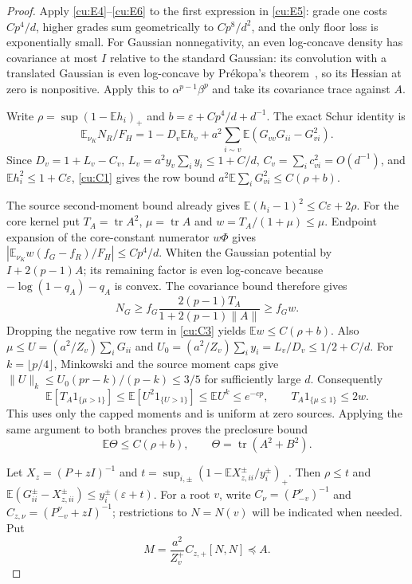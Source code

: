 \documentclass[10pt]{article}
\numberwithin{equation}{section}
\newcommand{\1}{\mathbf1}
\begin{document}
\begin{proof}
Apply \eqref{cu:E4}--\eqref{cu:E6} to the first expression in
\eqref{cu:E5}: grade one costs $Cp^4/d$, higher grades sum geometrically
to $Cp^8/d^2$, and the only floor loss is exponentially small.
For Gaussian nonnegativity, an even log-concave density has covariance
at most $I$ relative to the standard Gaussian: its convolution with
a translated Gaussian is even log-concave by Pr\'ekopa's theorem~\cite{Prekopa},
so its Hessian at zero is nonpositive. Apply this to
$\alpha^{p-1}\beta^p$ and take its covariance trace against $A$.

Write $\rho=\sup(1-\mathbb Eh_i)_+$ and
$b=\varepsilon+Cp^4/d+d^{-1}$. The exact Schur identity is
\[
 \mathbb E_{\nu_K}N_R/F_H
 =1-D_v\mathbb Eh_v
   +a^2\sum_{i\sim v}\mathbb E(G_{vv}G_{ii}-G_{vi}^2).
 \tag{C3}\label{cu:C3}
\]
Since $D_v=1+L_v-C_v$, $L_v=a^2y_v\sum_i y_i\le1+C/d$,
$C_v=\sum_i c_{vi}^2=O(d^{-1})$, and $\mathbb Eh_i^2\le1+C\varepsilon$,
\eqref{cu:C1} gives the row bound
$a^2\mathbb E\sum_iG_{vi}^2\le C(\rho+b)$.

The source second-moment bound already gives
$\mathbb E(h_i-1)^2\le C\varepsilon+2\rho$.
For the core kernel put $T_A=\operatorname{tr}A^2$,
$\mu=\operatorname{tr}A$ and $w=T_A/(1+\mu)\le\mu$.
Endpoint expansion of the core-constant numerator $w\Phi$ gives
$|\mathbb E_{\nu_K}w(f_G-f_R)/F_H|\le Cp^4/d$.
Whiten the Gaussian potential by $I+2(p-1)A$; its remaining factor
is even log-concave because $-\log(1-q_A)-q_A$ is convex.
The covariance bound therefore gives
\[
 N_G\ge f_G\frac{2(p-1)T_A}{1+2(p-1)\|A\|}\ge f_Gw.
\]
Dropping the negative row term in \eqref{cu:C3} yields
$\mathbb Ew\le C(\rho+b)$.
Also $\mu\le U=(a^2/Z_v)\sum_iG_{ii}$ and
$U_0=(a^2/Z_v)\sum_i y_i=L_v/D_v\le1/2+C/d$.
For $k=\lfloor p/4\rfloor$, Minkowski and the source moment caps give
$\|U\|_k\le U_0(pr-k)/(p-k)\le3/5$ for sufficiently large $d$.
Consequently
\[
 \mathbb E[T_A1_{\{\mu>1\}}]
 \le\mathbb E[U^2 1_{\{U>1\}}]\le\mathbb EU^k\le e^{-cp},
 \qquad T_A1_{\{\mu\le1\}}\le2w.
 \tag{C3a}\label{cu:core-tail}
\]
This uses only the capped moments and is uniform at zero sources.
Applying the same argument to both branches proves the preclosure bound
\[
 \mathbb E\Theta\le C(\rho+b),\qquad
 \Theta=\operatorname{tr}(A^2+B^2).
 \tag{C3b}\label{cu:preclosure-core}
\]

Let $X_z=(P+zI)^{-1}$ and
$t=\sup_{i,\pm}(1-\mathbb E X_{z,ii}^\pm/y_i^\pm)_+$.
Then $\rho\le t$ and
$\mathbb E(G_{ii}^\pm-X_{z,ii}^\pm)\le y_i^\pm(\varepsilon+t)$.
For a root $v$, write $C_\nu=(P^\nu_{-v})^{-1}$ and
$C_{z,\nu}=(P^\nu_{-v}+zI)^{-1}$; restrictions to $N=N(v)$
will be indicated when needed. Put
\[
 M=\frac{a^2}{Z_v^+}C_{z,+}[N,N]\preceq A.
\]


\end{proof}
\end{document}
